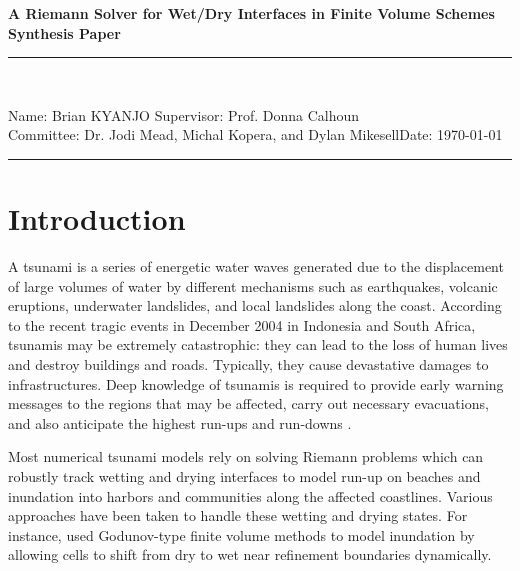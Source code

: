 \documentclass[11pt,a4paper]{article}
\newcommand{\donna}[1]{{\color{red}{#1}}}
\newcommand{\student}{Brian KYANJO }
\newcommand{\course}{Dr. Jodi Mead, Michal Kopera, and Dylan Mikesell}
\newcommand{\assignment}{ Prof. Donna Calhoun}
\begin{document}
	
	\thispagestyle{empty}
	\begin{center}
		\textbf{A Riemann Solver for Wet/Dry Interfaces in Finite Volume Schemes\\[0.5cm]
			Synthesis Paper}
		\vspace{.2cm}
	\end{center}
	
	
	\begin{center}
		\rule{17cm}{0.2cm}\\[0.3cm]
	\end{center}	
	
	\noindent	Name: \student \hfill Supervisor: \assignment\\[0.1cm]
	Committee: \course \hfill Date: \today\\
	\rule{17cm}{0.05cm}
	\vspace{.2cm}
	
	\section{Introduction}
	

				A tsunami is a series of energetic water waves generated due to the displacement of large volumes of water by different mechanisms such as earthquakes, volcanic eruptions, underwater landslides, and local landslides along the coast. According to the recent tragic events in December 2004 in Indonesia and  South Africa, tsunamis may be extremely catastrophic: they can lead to the loss of human lives and destroy buildings and roads. Typically, they cause devastative damages to infrastructures. Deep knowledge of tsunamis is required to provide early warning messages to the regions that may be affected, carry out necessary evacuations, and also anticipate the highest run-ups and run-downs \cite{sanchez2016uncertainty}.
				
				Most numerical tsunami models rely on solving Riemann problems which can robustly track wetting and drying interfaces to model run-up on beaches and inundation into harbors and communities along the affected coastlines.  Various approaches have been taken to handle these wetting and drying states. For instance, \citet{ge:2011} used Godunov-type finite volume methods to model inundation by allowing cells to shift from dry to wet near refinement boundaries dynamically. 
				
\end{document}
